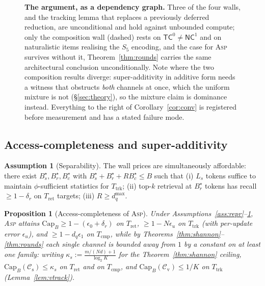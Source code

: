 \documentclass[10pt]{article}
\newtheorem{proposition}{Proposition}
\theoremstyle{definition}
\newtheorem{assumption}{Assumption}
\theoremstyle{plain}
\newcommand{\ASP}{\textsc{Asp}}
\renewcommand{\Cap}{\mathrm{Cap}}
\newcommand{\cs}{\mathcal{C}_{\mathrm{s}}}
\newcommand{\cv}{\mathcal{C}_{\mathrm{v}}}
\begin{document}
\begin{figure}[!t]
\caption{\textbf{The argument, as a dependency graph.} Three of the four walls, and the tracking lemma that replaces a previously deferred reduction, are unconditional and hold against unbounded compute; only the composition wall (dashed) rests on $\mathsf{TC}^0\neq\mathsf{NC}^1$ and on naturalistic items realising the $S_5$ encoding, and the case for \ASP{} survives without it, Theorem~\ref{thm:rounds} carries the same architectural conclusion unconditionally. Note where the two composition results diverge: super-additivity in additive form needs a witness that obstructs \emph{both} channels at once, which the uniform mixture is not (\S\ref{sec:theory}), so the mixture claim is dominance instead. Everything to the right of Corollary~\ref{cor:conv} is registered before measurement and has a stated failure mode.}
\label{fig:argument}
\end{figure}


\subsection{Access-completeness and super-additivity}

\begin{assumption}[Separability]
\label{ass:sep}
The wall prices are simultaneously affordable: there exist $B_s^{\star},B_r^{\star},B_c^{\star}$ with $B_s^{\star}+B_r^{\star}+RB_c^{\star}\le B$ such that (i) $L_s$ tokens suffice to maintain $\phi$-sufficient statistics for $T_{\mathrm{trk}}$; (ii) top-$k$ retrieval at $B_r^{\star}$ tokens has recall $\ge 1-\delta_r$ on $T_{\mathrm{ret}}$ targets; (iii) $R\ge d_q^{\max}$.
\end{assumption}

\begin{proposition}[Access-completeness of \ASP{}]
\label{prop:complete}
Under Assumptions~\ref{ass:repr}--\ref{ass:sep}, \ASP{} attains $\Cap_B\ge 1-(\epsilon_0+\delta_r)$ on $T_{\mathrm{ret}}$, $\ge 1-N\epsilon_u$ on $T_{\mathrm{trk}}$ (with per-update error $\epsilon_u$), and $\ge 1-d_q\epsilon_1$ on $T_{\mathrm{cmp}}$, while by Theorems~\ref{thm:shannon}--\ref{thm:rounds} each single channel is bounded away from $1$ by a constant on at least one family: writing
$\kappa_s:=\frac{m/(Nd)+1}{\log_2 K}$ for the Theorem~\ref{thm:shannon} ceiling,
$\Cap_B(\cs)\le\kappa_s$ on $T_{\mathrm{ret}}$ and on $T_{\mathrm{cmp}}$, and $\Cap_B(\cv)\le 1/K$ on $T_{\mathrm{trk}}$ (Lemma~\ref{lem:vtrack}).
\end{proposition}
\end{document}
